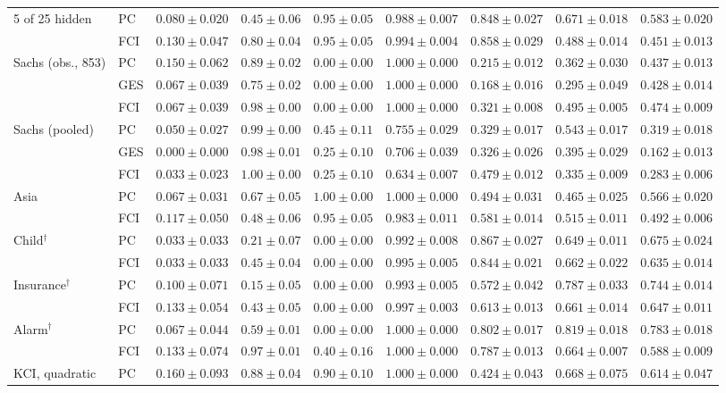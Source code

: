 \begin{tabular}{llccccccc}
5 of 25 hidden & PC & $0.080\pm0.020$ & $0.45\pm0.06$ & $0.95\pm0.05$ & $0.988\pm0.007$ & $0.848\pm0.027$ & $0.671\pm0.018$ & $0.583\pm0.020$ \\
 & FCI & $0.130\pm0.047$ & $0.80\pm0.04$ & $0.95\pm0.05$ & $0.994\pm0.004$ & $0.858\pm0.029$ & $0.488\pm0.014$ & $0.451\pm0.013$ \\
Sachs (obs., 853) & PC & $0.150\pm0.062$ & $0.89\pm0.02$ & $0.00\pm0.00$ & $1.000\pm0.000$ & $0.215\pm0.012$ & $0.362\pm0.030$ & $0.437\pm0.013$ \\
 & GES & $0.067\pm0.039$ & $0.75\pm0.02$ & $0.00\pm0.00$ & $1.000\pm0.000$ & $0.168\pm0.016$ & $0.295\pm0.049$ & $0.428\pm0.014$ \\
 & FCI & $0.067\pm0.039$ & $0.98\pm0.00$ & $0.00\pm0.00$ & $1.000\pm0.000$ & $0.321\pm0.008$ & $0.495\pm0.005$ & $0.474\pm0.009$ \\
Sachs (pooled) & PC & $0.050\pm0.027$ & $0.99\pm0.00$ & $0.45\pm0.11$ & $0.755\pm0.029$ & $0.329\pm0.017$ & $0.543\pm0.017$ & $0.319\pm0.018$ \\
 & GES & $0.000\pm0.000$ & $0.98\pm0.01$ & $0.25\pm0.10$ & $0.706\pm0.039$ & $0.326\pm0.026$ & $0.395\pm0.029$ & $0.162\pm0.013$ \\
 & FCI & $0.033\pm0.023$ & $1.00\pm0.00$ & $0.25\pm0.10$ & $0.634\pm0.007$ & $0.479\pm0.012$ & $0.335\pm0.009$ & $0.283\pm0.006$ \\
Asia & PC & $0.067\pm0.031$ & $0.67\pm0.05$ & $1.00\pm0.00$ & $1.000\pm0.000$ & $0.494\pm0.031$ & $0.465\pm0.025$ & $0.566\pm0.020$ \\
 & FCI & $0.117\pm0.050$ & $0.48\pm0.06$ & $0.95\pm0.05$ & $0.983\pm0.011$ & $0.581\pm0.014$ & $0.515\pm0.011$ & $0.492\pm0.006$ \\
Child$^\dagger$ & PC & $0.033\pm0.033$ & $0.21\pm0.07$ & $0.00\pm0.00$ & $0.992\pm0.008$ & $0.867\pm0.027$ & $0.649\pm0.011$ & $0.675\pm0.024$ \\
 & FCI & $0.033\pm0.033$ & $0.45\pm0.04$ & $0.00\pm0.00$ & $0.995\pm0.005$ & $0.844\pm0.021$ & $0.662\pm0.022$ & $0.635\pm0.014$ \\
Insurance$^\dagger$ & PC & $0.100\pm0.071$ & $0.15\pm0.05$ & $0.00\pm0.00$ & $0.993\pm0.005$ & $0.572\pm0.042$ & $0.787\pm0.033$ & $0.744\pm0.014$ \\
 & FCI & $0.133\pm0.054$ & $0.43\pm0.05$ & $0.00\pm0.00$ & $0.997\pm0.003$ & $0.613\pm0.013$ & $0.661\pm0.014$ & $0.647\pm0.011$ \\
Alarm$^\dagger$ & PC & $0.067\pm0.044$ & $0.59\pm0.01$ & $0.00\pm0.00$ & $1.000\pm0.000$ & $0.802\pm0.017$ & $0.819\pm0.018$ & $0.783\pm0.018$ \\
 & FCI & $0.133\pm0.074$ & $0.97\pm0.01$ & $0.40\pm0.16$ & $1.000\pm0.000$ & $0.787\pm0.013$ & $0.664\pm0.007$ & $0.588\pm0.009$ \\
KCI, quadratic & PC & $0.160\pm0.093$ & $0.88\pm0.04$ & $0.90\pm0.10$ & $1.000\pm0.000$ & $0.424\pm0.043$ & $0.668\pm0.075$ & $0.614\pm0.047$ \\
\bottomrule
\end{tabular}

